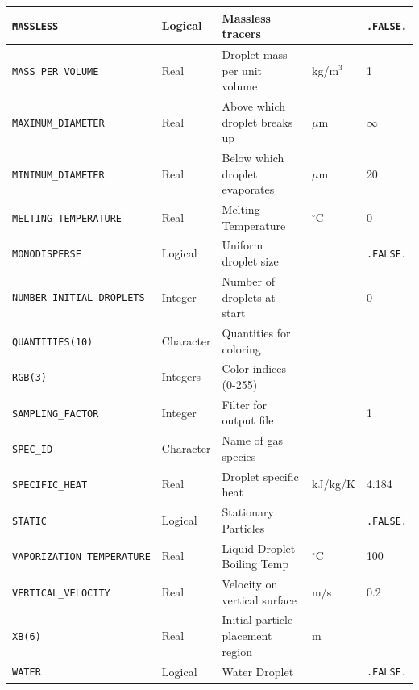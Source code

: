 \documentclass[11pt]{book}
\newcommand{\ct}{\tt\small}
\begin{document}
\begin{table}[H]
\begin{tabular*}{\textwidth}{@{\extracolsep{\fill}}|l|l|l|l|l|}
{\ct MASSLESS}                  & Logical         & Massless tracers                  &           & {\ct .FALSE.} \\ \hline
{\ct MASS\_PER\_VOLUME}         & Real            & Droplet mass per unit volume      & kg/m$^3$  & 1             \\ \hline
{\ct MAXIMUM\_DIAMETER}         & Real            & Above which droplet breaks up     & $\mu$m    & $\infty$      \\ \hline
{\ct MINIMUM\_DIAMETER}         & Real            & Below which droplet evaporates    & $\mu$m    & 20            \\ \hline
{\ct MELTING\_TEMPERATURE}      & Real            & Melting Temperature               & $^\circ$C & 0             \\ \hline
{\ct MONODISPERSE}              & Logical         & Uniform droplet size              &           & {\ct .FALSE.} \\ \hline
{\ct NUMBER\_INITIAL\_DROPLETS} & Integer         & Number of droplets at start       &           & 0             \\ \hline
{\ct QUANTITIES(10)}            & Character       & Quantities for coloring           &           &               \\ \hline
{\ct RGB(3)}                    & Integers        & Color indices (0-255)             &           &               \\ \hline
{\ct SAMPLING\_FACTOR}          & Integer         & Filter for output file            &           & 1             \\ \hline
{\ct SPEC\_ID}                  & Character       & Name of gas species               &           &               \\ \hline
{\ct SPECIFIC\_HEAT}            & Real            & Droplet specific heat             & kJ/kg/K   & 4.184         \\ \hline
{\ct STATIC}                    & Logical         & Stationary Particles              &           & {\ct .FALSE.} \\ \hline
{\ct VAPORIZATION\_TEMPERATURE} & Real            & Liquid Droplet Boiling Temp       & $^\circ$C & 100           \\ \hline
{\ct VERTICAL\_VELOCITY}        & Real            & Velocity on vertical surface      & m/s       &  0.2          \\ \hline
{\ct XB(6)}                     & Real            & Initial particle placement region & m         &               \\ \hline
{\ct WATER}                     & Logical         & Water Droplet                     &           & {\ct .FALSE.} \\ \hline
\end{tabular*}
\end{table}
\end{document}
